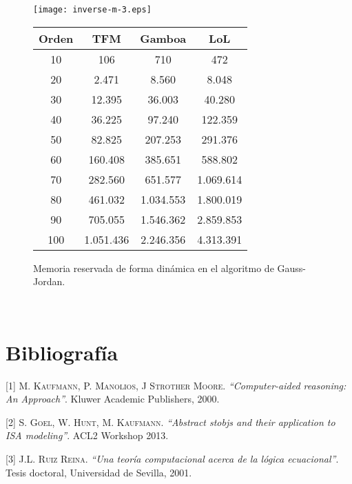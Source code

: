 \documentclass[a4paper,10pt]{article}
\begin{document}
\newpage
\begin{figure}[H]
\begin{center}
	\texttt{[image: inverse-m-3.eps]}	
\begin{tabular}{||c|c|c|c||}
\hline
\textbf{Orden} & \textbf{TFM} & \textbf{Gamboa} & \textbf{LoL} \\
\hline
10 &	106 &	710 &	472 \\
20 &	2.471 &	8.560 &	8.048 \\
30 &	12.395 &	36.003 &	40.280 \\
40 &	36.225 &	97.240 &	122.359 \\
50 &	82.825 &	207.253 &	291.376 \\
60 &	160.408 &	385.651	 & 588.802 \\
70 &	282.560 &	651.577 &	1.069.614 \\
80 &	461.032 &	1.034.553 &	1.800.019 \\
90 &	705.055 &	1.546.362 &	2.859.853 \\
100 &	1.051.436 &	2.246.356 &	4.313.391 \\
\hline
\end{tabular}
\end{center}
\caption{Memoria reservada de forma dinámica en el algoritmo de Gauss-Jordan.}
\end{figure}

\newpage
\
\newpage
\vspace{24pt}
\section{Bibliografía}

\vspace{16pt}

[1] \textsc{M. Kaufmann, P. Manolios, J Strother Moore.} \emph{``Computer-aided reasoning: An Approach''}. Kluwer Academic Publishers, 2000.

\par \vspace{16pt} \noindent

[2] \textsc{S. Goel, W. Hunt, M. Kaufmann.} \emph{``Abstract stobjs and their application to ISA modeling''}. ACL2 Workshop 2013.

\par \vspace{16pt} \noindent

[3] \textsc{J.L. Ruiz Reina.} \emph{``Una teoría computacional acerca de la lógica ecuacional''}. Tesis doctoral, Universidad de Sevilla, 2001.
\end{document}
